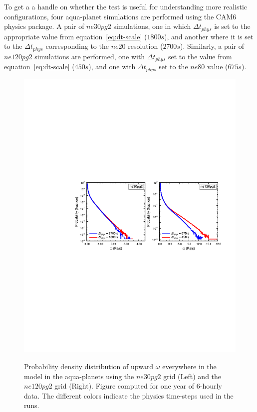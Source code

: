 \documentclass{agujournal}
\begin{document}
To get a a handle on whether the test is useful for understanding more realistic configurations, four aqua-planet simulations are performed using the CAM6 physics package. A pair of $ne30pg2$ simulations, one in which $\Delta t_{phys}$ is set to the appropriate value from equation~\eqref{eq:dt-scale} ($1800s$), and another where it is set to the $\Delta t_{phys}$ corresponding to the $ne20$ resolution ($2700s$). Similarly, a pair of $ne120pg2$ simulations are performed, one with $\Delta t_{phys}$ set to the value from equation~\eqref{eq:dt-scale} ($450s$), and one with $\Delta t_{phys}$ set to the $ne80$ value ($675s$). 

\begin{figure}[t]
\begin{center}
\noindent\includegraphics[width=30pc,angle=0]{figs/panel_pdf_dtphys.pdf}\\
\end{center}
\caption{Probability density distribution of upward $\omega$ everywhere in the model in the aqua-planets using the $ne30pg2$ grid (Left) and the $ne120pg2$ grid (Right). Figure computed for one year of 6-hourly data. The different colors indicate the physics time-steps used in the runs.}
\label{fig:pdf-dtphys}
\end{figure}
\end{document}
